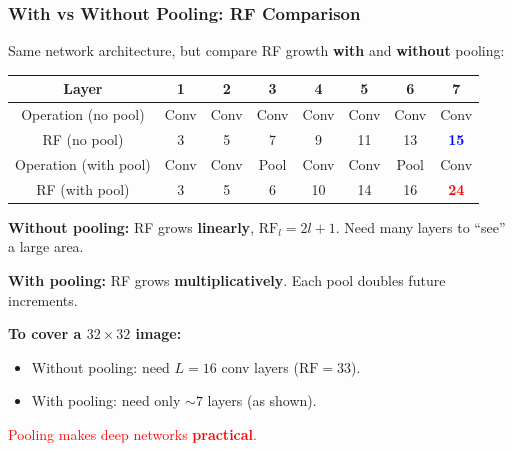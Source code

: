 \documentclass[notes,11pt, aspectratio=169]{beamer}
\begin{document}
\begin{frame}
\frametitle{With vs Without Pooling: RF Comparison}

Same network architecture, but compare RF growth \textbf{with} and \textbf{without} pooling:

\vspace{6pt}
\renewcommand{\arraystretch}{1.2}
\begin{center}
{\footnotesize
\begin{tabular}{c|ccccccc}
\toprule
\textbf{Layer} & 1 & 2 & 3 & 4 & 5 & 6 & 7 \\
\midrule
Operation (no pool) & Conv & Conv & Conv & Conv & Conv & Conv & Conv \\
RF (no pool) & 3 & 5 & 7 & 9 & 11 & 13 & \textcolor{blue}{\textbf{15}} \\
\midrule
Operation (with pool) & Conv & Conv & Pool & Conv & Conv & Pool & Conv \\
RF (with pool) & 3 & 5 & 6 & 10 & 14 & 16 & \textcolor{red}{\textbf{24}} \\
\bottomrule
\end{tabular}
}
\end{center}

\vspace{6pt}
\textbf{Without pooling:} RF grows \textbf{linearly}, $\text{RF}_l = 2l + 1$. Need many layers to ``see'' a large area.

\textbf{With pooling:} RF grows \textbf{multiplicatively}. Each pool doubles future increments.

\vspace{6pt}
\textbf{To cover a $32 \times 32$ image:}
\begin{itemize}
    \item Without pooling: need $L = 16$ conv layers ($\text{RF} = 33$).
    \item With pooling: need only $\sim 7$ layers (as shown).
\end{itemize}

\textcolor{red}{Pooling makes deep networks \textbf{practical}.}
\end{frame}
\end{document}
